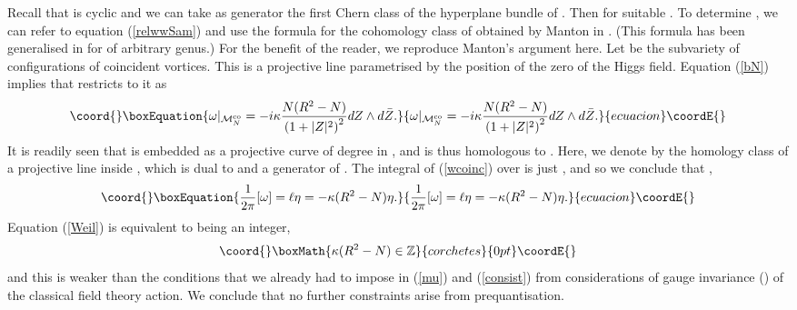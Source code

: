 \documentclass[a4paper,11pt]{article}
\begin{document}
Recall that \coordHE{} is cyclic and we can
take as generator the first Chern class \coordHE{} of the hyperplane bundle of 
\coordHE{}. Then \myHighlight{$[\omega] = 2 \pi \ell \eta$}\coordHE{} for suitable \coordHE{}. To determine \myHighlight{$\ell$}\coordHE{}, we can refer to equation
(\ref{relwwSam}) and use the formula for the cohomology class of 
\coordHE{} obtained by Manton in \cite{Msmv}. (This formula
has been generalised in \cite{MNvvms} for \myHighlight{$\Sigma$}\coordHE{} of arbitrary genus.) For
the benefit of the reader, we reproduce Manton's argument here. Let
\coordHE{} be the subvariety of
configurations of \coordHE{} coincident vortices. This is a projective line
parametrised by the position \coordHE{} of the zero of the Higgs field.
Equation (\ref{bN}) implies that \myHighlight{$\omega$}\coordHE{} restricts to it as
\begin{equation}\coord{}\boxEquation{\label{wcoinc}
\omega|_{{\cal M}^{\rm co}_{N}}=-i\kappa \frac{N(R^{2}-N)}
{\left(1+|Z|^{2}\right)^{2}}
dZ\wedge d\bar{Z}.
}{\omega|_{{\cal M}^{\rm co}_{N}}=-i\kappa \frac{N(R^{2}-N)}
{\left(1+|Z|^{2}\right)^{2}}
dZ\wedge d\bar{Z}.
}{ecuacion}\coordE{}\end{equation}
It is readily seen that \coordHE{} is embedded as a projective
curve of degree \coordHE{} in \coordHE{}, and is thus homologous to
\coordHE{}. 
Here, we denote by \myHighlight{$[\mathbb{CP}^{1}]$}\coordHE{} the homology class of a
projective line inside \coordHE{}, which is dual to \myHighlight{$\eta$}\coordHE{} and 
a generator of \coordHE{}.
The integral of (\ref{wcoinc}) over 
\coordHE{} is just \coordHE{}, and so
we conclude that \coordHE{},
\begin{equation}\coord{}\boxEquation{ \label{ell}
\frac{1}{2\pi}[\omega]=\ell \eta=-\kappa (R^{2}-N)\eta.
}{ \frac{1}{2\pi}[\omega]=\ell \eta=-\kappa (R^{2}-N)\eta.
}{ecuacion}\coordE{}\end{equation}
Equation (\ref{Weil}) is equivalent to \myHighlight{$\ell$}\coordHE{} being an integer,
\[\coord{}\boxMath{
\kappa (R^{2}-N)\in \mathbb{Z}
}{corchetes}{0pt}\coordE{}\]
and this is weaker than the conditions 
\coordHE{} 
that we already had to impose in (\ref{mu}) and (\ref{consist}) from 
considerations of gauge invariance (\coordHE{}) of the classical 
field theory action. We conclude that no further constraints arise 
from prequantisation.
\end{document}
